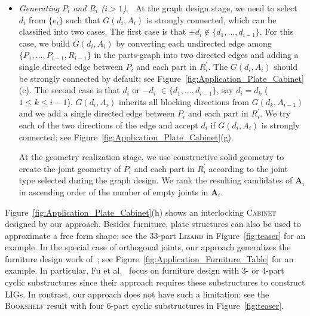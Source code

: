\begin{itemize}[leftmargin=*]
 
 \vspace{1mm}
\item 
 {\em Generating $P_i$ and $R_i$ ($i>1$).} \
 At the graph design stage, we need to select $d_i$ from $\{e_i\}$ such that $G(d_i, A_i)$ is strongly connected, which can be classified into two cases.
 The first case is that $\pm d_i \notin \{d_1, ..., d_{i-1} \}$. 
 For this case, we build $G(d_i, A_i)$ by converting each undirected edge among $\{P_1, ..., P_{i-1}, R_{i-1}\}$ in the parts-graph into two directed edges and adding a single directed edge between $P_i$ and each part in $R_i^{'}$. 
 The $G(d_i, A_i)$ should be strongly connected by default; see Figure~\ref{fig:Application_Plate_Cabinet}(c).
 The second case is that $d_i$ or $-d_i$ $\in \{d_1, ..., d_{i-1} \}$, say $d_i = d_k$ ($1\leq k \leq i-1$).
$G(d_i, A_i)$ inherits all blocking directions from $G(d_k, A_{i-1})$ and we add a single directed edge between $P_i$ and each part in $R_i^{'}$.
We try each of the two directions of the edge and accept $d_i$ if $G(d_i, A_i)$ is strongly connected; see Figure~\ref{fig:Application_Plate_Cabinet}(g).

 \vspace{0.5mm}
 At the geometry realization stage, we use constructive solid geometry to create the joint geometry of $P_i$ and each part in $R_i^{'}$ according to the joint type selected during the graph design.
We rank the resulting candidates of $\mathbf{A}_i$ in ascending order of the number of empty joints in $\mathbf{A}_i$.

 \end{itemize}

Figure~\ref{fig:Application_Plate_Cabinet}(h) shows an interlocking \textsc{Cabinet} designed by our approach.
Besides furniture, plate structures can also be used to approximate a free form shape; see the 33-part \textsc{Lizard}  in Figure~\ref{fig:teaser} for an example.
In the special case of orthogonal joints, our approach generalizes the furniture design work of~\cite{Fu-2015-Furniture}; see Figure~\ref{fig:Application_Furniture_Table} for an example.
In particular, Fu et al.~\shortcite{Fu-2015-Furniture} focus on furniture design with 3- or 4-part cyclic substructures since their approach requires these substructures to construct LIGs.
In contrast, our approach does not have such a limitation; see the \textsc{Bookshelf} result with four 6-part cyclic substructures in Figure~\ref{fig:teaser}.

